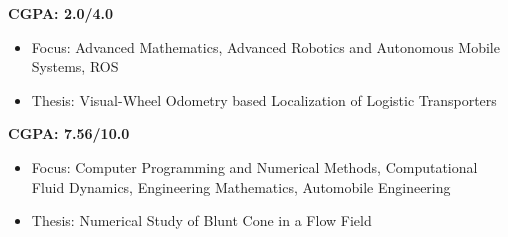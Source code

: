 \documentclass[11pt,a4paper,roman]{moderncv} %
\begin{document}
{
\textbf{CGPA: 2.0/4.0}
\vspace{5pt}
\begin{itemize}
\item Focus: Advanced Mathematics, Advanced Robotics and Autonomous Mobile Systems, ROS
\item Thesis: Visual-Wheel Odometry based Localization of Logistic Transporters
\end{itemize}
}

\vspace{10pt}

{
\textbf{CGPA: 7.56/10.0}
\vspace{5pt}
\begin{itemize}
\item Focus: Computer Programming and Numerical Methods, Computational Fluid Dynamics, Engineering Mathematics, Automobile Engineering
\item Thesis: Numerical Study of Blunt Cone in a Flow Field
\end{itemize}
}



\end{document}
